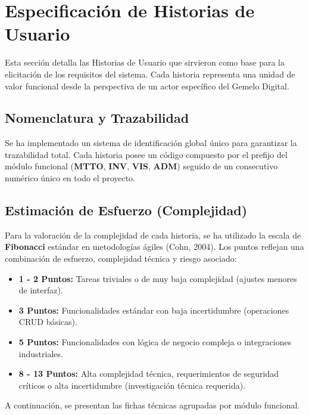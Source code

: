 \section{Especificación de Historias de Usuario}

Esta sección detalla las Historias de Usuario que sirvieron como base para la elicitación de los requisitos del sistema. Cada historia representa una unidad de valor funcional desde la perspectiva de un actor específico del Gemelo Digital.

\subsection*{Nomenclatura y Trazabilidad}
Se ha implementado un sistema de identificación global único para garantizar la trazabilidad total. Cada historia posee un código compuesto por el prefijo del módulo funcional (\textbf{MTTO}, \textbf{INV}, \textbf{VIS}, \textbf{ADM}) seguido de un consecutivo numérico único en todo el proyecto.

\subsection*{Estimación de Esfuerzo (Complejidad)}
Para la valoración de la complejidad de cada historia, se ha utilizado la escala de \textbf{Fibonacci} estándar en metodologías ágiles (Cohn, 2004). Los puntos reflejan una combinación de esfuerzo, complejidad técnica y riesgo asociado:

\begin{itemize}[leftmargin=1.5em, nosep]
    \item \textbf{1 - 2 Puntos:} Tareas triviales o de muy baja complejidad (ajustes menores de interfaz).
    \item \textbf{3 Puntos:} Funcionalidades estándar con baja incertidumbre (operaciones CRUD básicas).
    \item \textbf{5 Puntos:} Funcionalidades con lógica de negocio compleja o integraciones industriales.
    \item \textbf{8 - 13 Puntos:} Alta complejidad técnica, requerimientos de seguridad críticos o alta incertidumbre (investigación técnica requerida).
\end{itemize}

\vspace{1em}
A continuación, se presentan las fichas técnicas agrupadas por módulo funcional.





